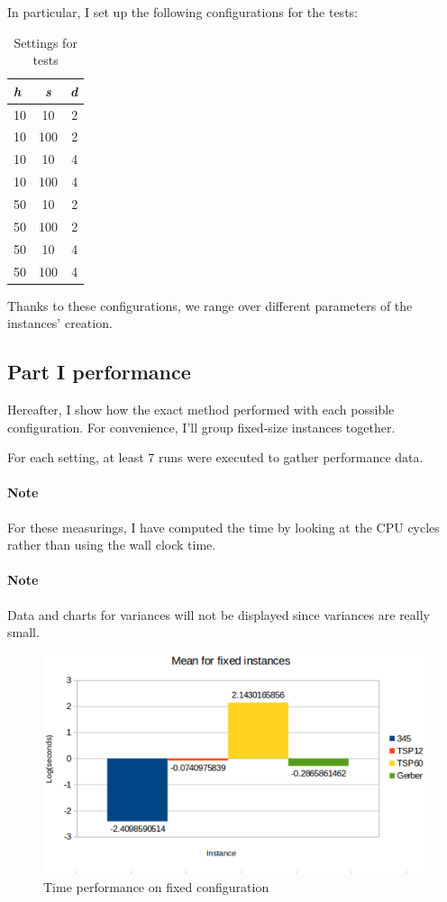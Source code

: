 In particular, I set up the following configurations for the tests:

\begin{table}[H]
  \centering
  \begin{tabular}{|l|c|r|}
    \hline
    \textbf{\textit{h}} & \textbf{\textit{s}} & \textbf{\textit{d}} \\
    \hline
    \hline
    10 & 10  & 2 \\
    \hline
    10 & 100 & 2 \\
    \hline
    10 & 10  & 4 \\
    \hline
    10 & 100 & 4 \\
    \hline
    50 & 10  & 2 \\
    \hline
    50 & 100 & 2 \\
    \hline
    50 & 10  & 4 \\
    \hline
    50 & 100 & 4 \\
    \hline
  \end{tabular}
  \caption{Settings for tests}
  \label{tab:settings}
\end{table}

Thanks to these configurations, we range over different parameters of the
instances' creation.

\subsection{Part I performance}

Hereafter, I show how the exact method performed with each possible
configuration. For convenience, I'll group fixed-size instances together.

For each setting, at least 7 runs were executed to gather performance data.

\paragraph{Note} For these measurings, I have computed the time by looking at
the CPU cycles rather than using the wall clock time.

\paragraph{Note} Data and charts for variances will not be displayed since
variances are really small.

\begin{figure}[H]
  \centering
  \includegraphics[width=.8\columnwidth]{pics/partI/mean-fixed.eps}
  \caption{Time performance on fixed configuration}
  \label{fig:mean-time-fixed}
\end{figure}

